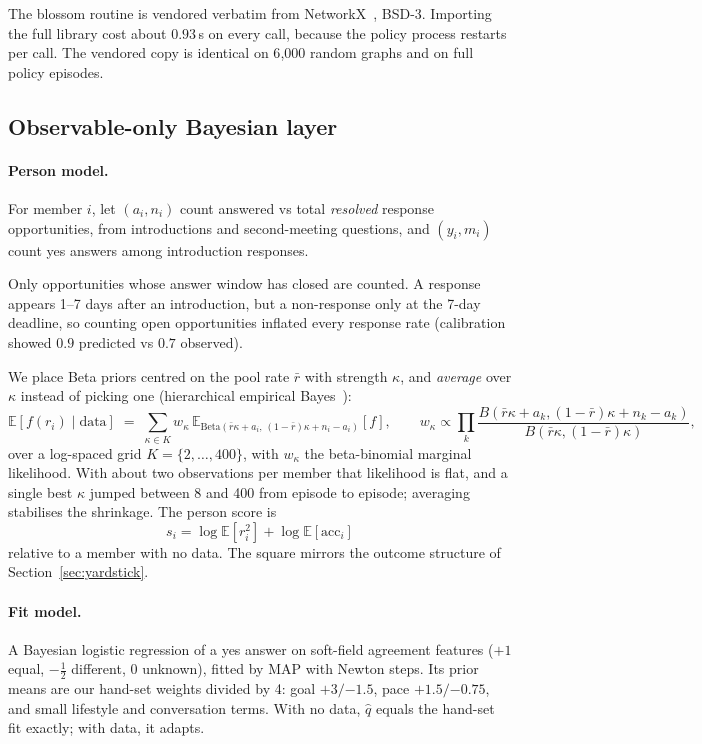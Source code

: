 \documentclass[10pt]{article}
\begin{document}
The blossom routine is vendored verbatim from NetworkX~\cite{hagberg2008networkx}, BSD-3. Importing the full library cost about $0.93$\,s on every call, because the policy process restarts per call. The vendored copy is identical on 6{,}000 random graphs and on full policy episodes.

\subsection{Observable-only Bayesian layer}\label{sec:bayes}

\paragraph{Person model.} For member $i$, let $(a_i, n_i)$ count answered vs total \emph{resolved} response opportunities, from introductions and second-meeting questions, and $(y_i, m_i)$ count yes answers among introduction responses.

Only opportunities whose answer window has closed are counted. A response appears 1--7 days after an introduction, but a non-response only at the 7-day deadline, so counting open opportunities inflated every response rate (calibration showed $0.9$ predicted vs $0.7$ observed).

We place Beta priors centred on the pool rate $\bar r$ with strength $\kappa$, and \emph{average} over $\kappa$ instead of picking one (hierarchical empirical Bayes~\cite{robbins1956empirical,gelman2013bayesian}):
\begin{equation}
\mathbb{E}[f(r_i)\mid\text{data}] \;=\; \sum_{\kappa\in K} w_\kappa\, \mathbb{E}_{\mathrm{Beta}(\bar r\kappa + a_i,\,(1-\bar r)\kappa + n_i - a_i)}[f],
\qquad
w_\kappa \propto \prod_{k}\frac{B(\bar r\kappa+a_k,(1-\bar r)\kappa+n_k-a_k)}{B(\bar r\kappa,(1-\bar r)\kappa)},
\end{equation}
over a log-spaced grid $K=\{2,\dots,400\}$, with $w_\kappa$ the beta-binomial marginal likelihood. With about two observations per member that likelihood is flat, and a single best $\kappa$ jumped between 8 and 400 from episode to episode; averaging stabilises the shrinkage. The person score is
\[
s_i=\log\mathbb{E}[r_i^2]+\log\mathbb{E}[\text{acc}_i]
\]
relative to a member with no data. The square mirrors the outcome structure of Section~\ref{sec:yardstick}.

\paragraph{Fit model.} A Bayesian logistic regression of a yes answer on soft-field agreement features ($+1$ equal, $-\tfrac12$ different, $0$ unknown), fitted by MAP with Newton steps. Its prior means are our hand-set weights divided by 4: goal $+3/{-1.5}$, pace $+1.5/{-0.75}$, and small lifestyle and conversation terms. With no data, $\hat q$ equals the hand-set fit exactly; with data, it adapts.
\end{document}
